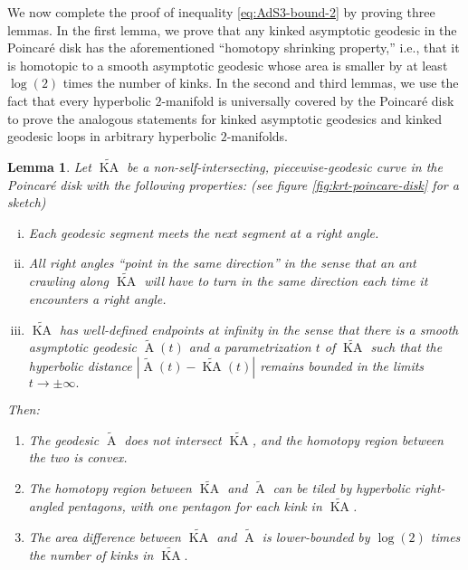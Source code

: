 \documentclass[a4paper,11pt]{article}
\renewcommand{\tilde}{\widetilde}
\newcommand{\KA}{\operatorname{KA}}
\newcommand{\A}{\operatorname{A}}
\newtheorem{lemma}[theorem]{Lemma}
\begin{document}
We now complete the proof of inequality \eqref{eq:AdS3-bound-2} by proving three lemmas. In the first lemma, we prove that any kinked asymptotic geodesic in the Poincar\'{e} disk has the aforementioned ``homotopy shrinking property,'' i.e., that it is homotopic to a smooth asymptotic geodesic whose area is smaller by at least $\log(2)$ times the number of kinks. In the second and third lemmas, we use the fact that every hyperbolic $2$-manifold is universally covered by the Poincar\'{e} disk to prove the analogous statements for kinked asymptotic geodesics and kinked geodesic loops in arbitrary hyperbolic $2$-manifolds.

\begin{lemma}
    \label{lem:poincare-disk}
    Let $\tilde{\KA}$ be a non-self-intersecting, piecewise-geodesic curve in the Poincar\'{e} disk with the following properties: (see figure \ref{fig:krt-poincare-disk} for a sketch)
        \begin{enumerate}[(i)]
            \item Each geodesic segment meets the next segment at a right angle.
            \item All right angles ``point in the same direction'' in the sense that an ant crawling along $\tilde{\KA}$ will have to turn in the same direction each time it encounters a right angle.
            \item $\tilde{\KA}$ has well-defined endpoints at infinity in the sense that there is a smooth asymptotic geodesic $\tilde{\A}(t)$ and a parametrization $t$ of $\tilde{\KA}$ such that the hyperbolic distance $|\tilde{\A}(t) - \tilde{\KA}(t)|$ remains bounded in the limits $t \rightarrow \pm \infty.$
        \end{enumerate}
        
        Then:
        \begin{enumerate}[(1)]
            \item The geodesic $\tilde{\A}$ does not intersect $\tilde{\KA}$, and the homotopy region between the two is convex.
            \item The homotopy region between $\tilde{\KA}$ and $\tilde{\A}$ can be tiled by hyperbolic right-angled pentagons, with one pentagon for each kink in $\tilde{\KA}$.
            \item The area difference between $\tilde{\KA}$ and $\tilde{\A}$ is lower-bounded by $\log(2)$ times the number of kinks in $\tilde{\KA}.$
        \end{enumerate}
\end{lemma}
\end{document}
